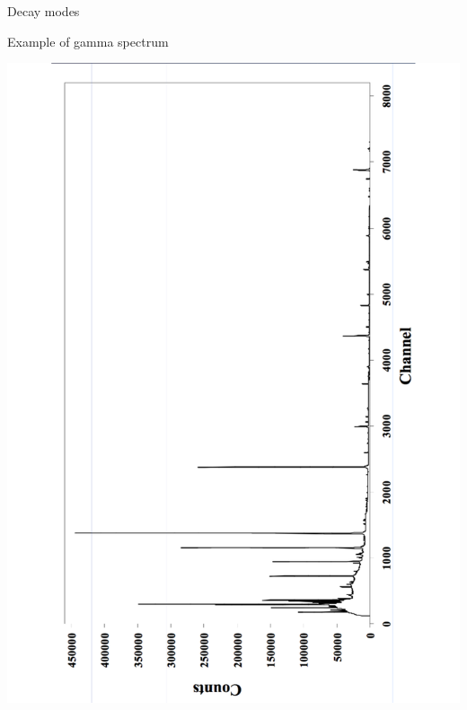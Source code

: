 \begin{frame}{Decay modes}

\alert{Example of gamma spectrum}

\centering
\includegraphics[scale=0.35, angle=-90]{figures/20160218_rsw_gammaspectrum.pdf}

\end{frame}


